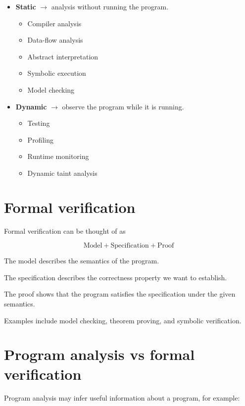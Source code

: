 \documentclass[11pt]{book}
\begin{document}
\begin{itemize}
    \item \textbf{Static} $\rightarrow$ analysis without running
    the program.
    \begin{itemize}
        \item Compiler analysis
        \item Data-flow analysis
        \item Abstract interpretation
        \item Symbolic execution
        \item Model checking
    \end{itemize}

    \item \textbf{Dynamic} $\rightarrow$ observe the program
    while it is running.
    \begin{itemize}
        \item Testing
        \item Profiling
        \item Runtime monitoring
        \item Dynamic taint analysis
    \end{itemize}
\end{itemize}

\section{Formal verification}

Formal verification can be thought of as

\[
\text{Model}+\text{Specification}+\text{Proof}
\]

\begin{ppdefn}
The model describes the semantics of the program.

The specification describes the correctness property
we want to establish.

The proof shows that the program satisfies the specification
under the given semantics.
\end{ppdefn}

Examples include model checking, theorem proving,
and symbolic verification.

\section{Program analysis vs formal verification}

Program analysis may infer useful information about
a program, for example:
\end{document}
